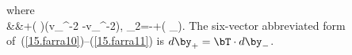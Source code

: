 \en
where
\eqa \label{15.farra10}  \nonumber \\
&&\mbox{}+\half\left(
\right)\bnh\bdel(v_{\raisebox{0.2 ex}{$\scriptstyle +$}}^{-2}
-v_{\raisebox{0.2 ex}{$\scriptstyle -$}}^{-2}),
\ena
\eq \label{15.farra11}
\bT_2=\bI-\bnh\bnh+\left(\frac{\bnh\cdot\bp_{\raisebox{0.2 ex}
{$\scriptstyle -$}}}
{\bnh\cdot\bp_{\raisebox{0.2 ex}{$\scriptstyle +$}}}\right)\bnh\bnh.
\en
The six-vector abbreviated form of~(\ref{15.farra10})--(\ref{15.farra11})
is $d\by_+=\bT\cdot d\by_-$.

